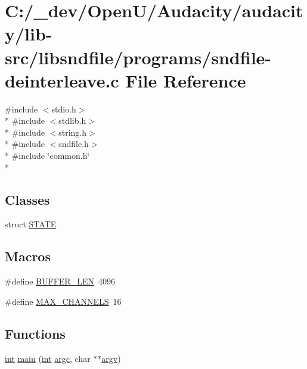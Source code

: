 \hypertarget{sndfile-deinterleave_8c}{}\section{C\+:/\+\_\+dev/\+Open\+U/\+Audacity/audacity/lib-\/src/libsndfile/programs/sndfile-\/deinterleave.c File Reference}
\label{sndfile-deinterleave_8c}
{\ttfamily \#include $<$stdio.\+h$>$}\\*
{\ttfamily \#include $<$stdlib.\+h$>$}\\*
{\ttfamily \#include $<$string.\+h$>$}\\*
{\ttfamily \#include $<$sndfile.\+h$>$}\\*
{\ttfamily \#include \char`\"{}common.\+h\char`\"{}}\\*
\subsection*{Classes}
\begin{DoxyCompactItemize}
\item 
struct \hyperlink{struct_s_t_a_t_e}{S\+T\+A\+TE}
\end{DoxyCompactItemize}
\subsection*{Macros}
\begin{DoxyCompactItemize}
\item 
\#define \hyperlink{sndfile-deinterleave_8c_a46130dc86f2322714bba26960b64e7bb}{B\+U\+F\+F\+E\+R\+\_\+\+L\+EN}~4096
\item 
\#define \hyperlink{sndfile-deinterleave_8c_ac69ee46f4a51ed14f0d68628c2dec71d}{M\+A\+X\+\_\+\+C\+H\+A\+N\+N\+E\+LS}~16
\end{DoxyCompactItemize}
\subsection*{Functions}
\begin{DoxyCompactItemize}
\item 
\hyperlink{xmltok_8h_a5a0d4a5641ce434f1d23533f2b2e6653}{int} \hyperlink{sndfile-deinterleave_8c_a3c04138a5bfe5d72780bb7e82a18e627}{main} (\hyperlink{xmltok_8h_a5a0d4a5641ce434f1d23533f2b2e6653}{int} \hyperlink{cmdline_8c_aaffeb1bf2056ea44af5b5d0ee4d6ff07}{argc}, char $\ast$$\ast$\hyperlink{cmdline_8c_ad407d5ba91709bd9b092003858600723}{argv})
\end{DoxyCompactItemize}


